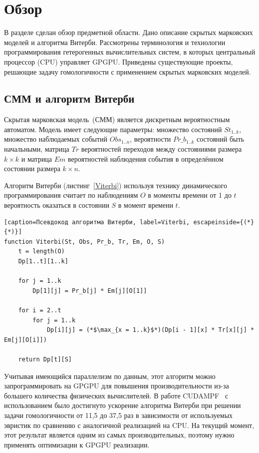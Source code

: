 \section{Обзор}
В разделе сделан обзор предметной области.
Дано описание скрытых марковских моделей и алгоритма Витерби.
Рассмотрены терминология и технологии программирования гетерогенных
вычислительных систем, в которых центральный процессор (CPU) управляет GPGPU.
Приведены существующие проекты, решающие задачу гомологичности с применением 
скрытых марковских моделей.


\subsection{СММ и алгоритм Витерби}
Скрытая марковская модель~(СММ) является дискретным вероятностным автоматом.
Модель имеет следующие параметры: множество состояний $St_{1..k}$, множество 
наблюдаемых событий $Obs_{1..n}$, вероятности $Pr\_b_{1..k}$ состояний быть
начальными, матрица $Tr$ вероятностей переходов между состояниями размера $k
\times k$ и матрица $Em$ вероятностей наблюдения события в определённом 
состоянии размера ${k\times n}$.

Алгоритм Витерби (листинг~\ref{Viterbi}) используя технику динамического 
программирования считает по наблюдениям $O$ в моменты времени от 1 до
$t$ вероятность оказаться в состоянии $S$ в момент времени $t$.

\begin{lstlisting}[caption=Псевдокод алгоритма Витерби, label=Viterbi, escapeinside={(*}{*)}]
function Viterbi(St, Obs, Pr_b, Tr, Em, O, S)
	t = length(O)
	Dp[1..t][1..k]

	for j = 1..k
		Dp[1][j] = Pr_b[j] * Em[j][O[1]]
	
	for i = 2..t
		for j = 1..k
			Dp[i][j] = (*$\max_{x = 1..k}$*)(Dp[i - 1][x] * Tr[x][j] * Em[j][O[i]])

	return Dp[t][S]
\end{lstlisting}

Учитывая имеющийся параллелизм по данным, этот алгоритм можно запрограммировать 
на GPGPU для повышения производительности из-за большего количества физических 
вычислителей.
В работе CUDAMPF~\cite{cudampf} с использованием  было 
достигнуто ускорение алгоритма Витерби при решении задачи гомологичности от 
11,5 до 37,5 раз в зависимости от используемых эвристик по сравнению с
аналогичной реализацией на CPU.
На текущий момент, этот результат является одним из самых производительных, 
поэтому нужно применять оптимизации к GPGPU реализации.


